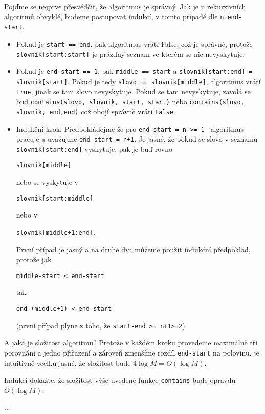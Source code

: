 Pojďme se nejprve přesvědčit, že algoritmus je správný. Jak je u rekurzivních algoritmů obvyklé, budeme postupovat indukcí, v tomto případě dle {\tt n=end-start}.
\begin{itemize}
 \item[{\tt n=0}] Pokud je {\tt start == end}, pak algoritmus vrátí False, což je správně, protože {\tt slovnik[start:start]} je prázdný seznam ve kterém se nic nevyskytuje.
 \item[{\tt n=1}] Pokud je {\tt end-start == 1}, pak {\tt middle == start} a {\tt slovnik[start:end] = slovnik[start]}. Pokud je tedy {\tt slovo == slovnik[middle]}, algoritmus
vrátí {\tt True}, jinak se tam slovo nevyskytuje. Pokud se tam nevyskytuje, zavolá se buď {\tt contains(slovo, slovnik, start, start)} nebo {\tt contains(slovo, slovnik, end,end)} což obojí
správně vrátí {\tt False}.
 \item[{\tt n+1}] Indukční krok. Předpokládejme že pro {\tt end-start = n >= 1 } algoritmus pracuje a uvažujme {\tt end-start = n+1}. Je jasné, že 
pokud se slovo v seznamu {\tt slovnik[start:end]} vyskytuje, pak je buď rovno
\begin{center}
{\tt slovnik[middle]} 
\end{center}
nebo se vyskytuje v
\begin{center}
{\tt slovnik[start:middle]}
\end{center}
nebo v
\begin{center}
{\tt slovnik[middle+1:end]}.
\end{center}
První případ je jasný a na druhé dva můžeme použít indukční předpoklad, protože jak 
\begin{center}
{\tt middle-start < end-start} 
\end{center}
tak 
\begin{center}
{\tt end-(middle+1) < end-start} 
\end{center}
(první případ plyne z toho, že {\tt start-end >= n+1>=2}).
\end{itemize}

A jaká je složitost algoritmu? Protože v každém kroku provedeme maximálně tři porovnání a jedno přiřazení a zároveň zmenšíme rozdíl {\tt end-start} na polovinu,
je intuitivně vcelku jasné, že složitost bude $4\log M = O(\log M)$.

\begin{cviceni} Indukcí dokažte, že složitost výše uvedené funkce {\tt contains} bude opravdu $O(\log M)$.
\end{cviceni}
\begin{reseni} ...
\end{reseni}

